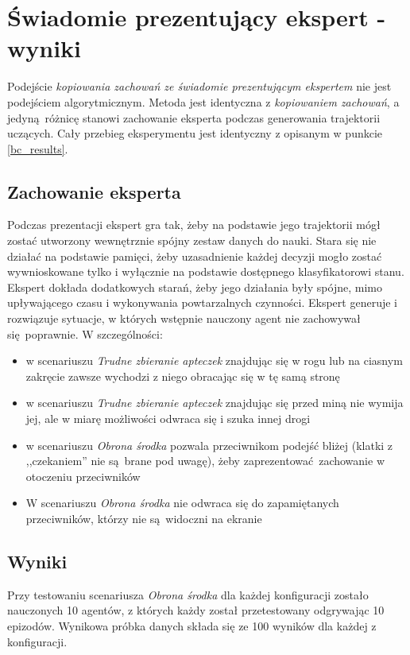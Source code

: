 \section{Świadomie prezentujący ekspert - wyniki}

Podejście \textit{kopiowania zachowań ze świadomie prezentującym ekspertem} nie jest podejściem algorytmicznym. Metoda jest identyczna z \textit{kopiowaniem zachowań}, a jedyną różnicę stanowi zachowanie eksperta podczas generowania trajektorii uczących. Cały przebieg eksperymentu jest identyczny z opisanym w punkcie \ref{bc_results}.
\subsection {Zachowanie eksperta}
Podczas prezentacji ekspert gra tak, żeby na podstawie jego trajektorii mógł zostać utworzony wewnętrznie spójny zestaw danych do nauki. Stara się nie działać na podstawie pamięci, żeby uzasadnienie każdej decyzji mogło zostać wywnioskowane tylko i wyłącznie na podstawie dostępnego klasyfikatorowi stanu. Ekspert dokłada dodatkowych starań, żeby jego działania były spójne, mimo upływającego czasu i wykonywania powtarzalnych czynności. Ekspert generuje i rozwiązuje sytuacje, w których wstępnie nauczony agent nie zachowywał się poprawnie. W szczególności:
\begin{itemize}
\item{w scenariuszu \textit{Trudne zbieranie apteczek} znajdując się w rogu lub na ciasnym zakręcie zawsze wychodzi z niego obracając się w tę samą stronę}
\item{w scenariuszu \textit{Trudne zbieranie apteczek} znajdując się przed miną nie wymija jej, ale w miarę możliwości odwraca się i szuka innej drogi}
\item{w scenariuszu \textit{Obrona środka} pozwala przeciwnikom podejść bliżej (klatki z ,,czekaniem'' nie są brane pod uwagę), żeby zaprezentować zachowanie w otoczeniu przeciwników}
\item{W scenariuszu \textit{Obrona środka} nie odwraca się do zapamiętanych przeciwników, którzy nie są widoczni na ekranie}
\end{itemize}

\subsection{Wyniki}

Przy testowaniu scenariusza \textit{Obrona środka} dla każdej konfiguracji zostało nauczonych 10 agentów, z których każdy został przetestowany odgrywając 10 epizodów. Wynikowa próbka danych składa się ze 100 wyników dla każdej z konfiguracji.

